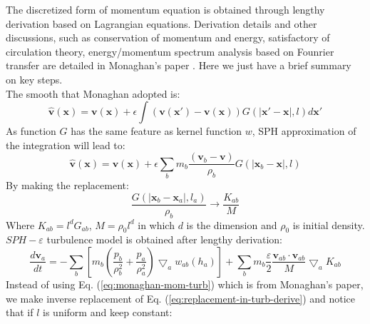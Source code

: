 \documentclass[journal abbreviation, manuscript]{copernicus}
\begin{document}
The discretized form of momentum equation is obtained through lengthy derivation based on Lagrangian equations. Derivation details and other discussions, such as conservation of momentum and energy, satisfactory of circulation theory, energy/momentum spectrum analysis based on Founrier transfer are detailed in Monaghan's paper \citep{monaghan2011turbulence}. Here we just have a brief summary on key steps.\\
The smooth that Monaghan adopted is:
\begin{equation}
\widehat{\textbf{v}}(\textbf{x})=\textbf{v}(\textbf{x})+ \epsilon \int (\textbf{v}(\textbf{x} \prime)-\textbf{v}(\textbf{x}))G(\vert \textbf{x} \prime - \textbf{x} \vert, l) d\textbf{x} \prime
\end{equation}
As function $G$ has the same feature as kernel function $w$, SPH approximation of the integration will lead to:
\begin{equation} \label{eq:SPH-epsilon-filtering}
\widehat{\textbf{v}}(\textbf{x})=\textbf{v}(\textbf{x})+\epsilon \sum_b m_b \dfrac{(\textbf{v}_b -\textbf{v})}{\rho _b} G(\vert \textbf{x} _b - \textbf{x} \vert, l)
\end{equation}
By making the replacement:
\begin{equation}
\label{eq:replacement-in-turb-derive}
\dfrac{G(\vert \textbf{x} _b - \textbf{x} _a \vert, l_a)}{\rho _b} \rightarrow \dfrac{K_{ab}}{M}
\end{equation}
Where $K_{ab} = l^d G_{ab}$, $M = \rho_0 l^d$ in which $d$ is the dimension and $\rho_0$ is initial density. $SPH-\varepsilon$ turbulence model is obtained after lengthy derivation:
\begin{equation}
\label{eq:monaghan-mom-turb}
\dfrac{d \textbf{v}_a}{dt} = -\sum_b [m_b (\dfrac{p_b}{\rho_b^2} + \dfrac{p_a}{\rho_a^2}) \bigtriangledown_aw_{a b}(h_a)] + \sum_b m_b \dfrac{\varepsilon}{2} \dfrac{\textbf{v}_{ab} \cdot \textbf{v}_{ab}}{M} \bigtriangledown_a K_{ab}
\end{equation}
Instead of using Eq. (\ref{eq:monaghan-mom-turb}) which is from Monaghan's paper, we make inverse replacement of Eq. (\ref{eq:replacement-in-turb-derive}) and notice that if $l$ is uniform and keep constant: 
\end{document}
